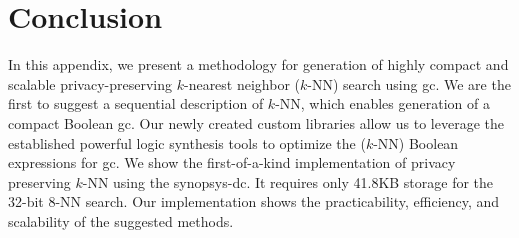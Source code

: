 \begin{table}
\centering
\caption{Circuit size and timing evaluation for $k$-NN search.}
\label{tab:k_nns}
\end{table}

\section{Conclusion}\label{sec:knn-conc}
In this appendix, we present a methodology for generation of highly compact and scalable privacy-preserving $k$-nearest neighbor ($k$-NN) search using \acrshort{gc}.
We are the first to suggest a sequential description of $k$-NN, which enables generation of a compact Boolean \acrshort{gc}.
Our newly created custom libraries allow us to leverage the established powerful logic synthesis tools to optimize the ($k$-NN) Boolean expressions for \acrshort{gc}.
We show the first-of-a-kind implementation of privacy preserving $k$-NN using the \acrfull{synopsys-dc}.
It requires only 41.8KB storage for the 32-bit 8-NN search.
Our implementation shows the practicability, efficiency, and scalability of the suggested methods.
